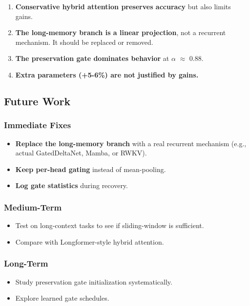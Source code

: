 \begin{enumerate}
\item \textbf{Conservative hybrid attention preserves accuracy} but also limits
  gains.
\item \textbf{The long-memory branch is a linear projection}, not a recurrent
  mechanism. It should be replaced or removed.
\item \textbf{The preservation gate dominates behavior} at $\alpha$ $\approx$ 0.88.
\item \textbf{Extra parameters (+5-6\%) are not justified by gains.}

\end{enumerate}
\subsection{Future Work}

\subsubsection{Immediate Fixes}

\begin{itemize}
\item \textbf{Replace the long-memory branch} with a real recurrent mechanism (e.g.,
  actual GatedDeltaNet, Mamba, or RWKV).
\item \textbf{Keep per-head gating} instead of mean-pooling.
\item \textbf{Log gate statistics} during recovery.

\end{itemize}
\subsubsection{Medium-Term}

\begin{itemize}
\item Test on long-context tasks to see if sliding-window is sufficient.
\item Compare with Longformer-style hybrid attention.

\end{itemize}
\subsubsection{Long-Term}

\begin{itemize}
\item Study preservation gate initialization systematically.
\item Explore learned gate schedules.

\end{itemize}
